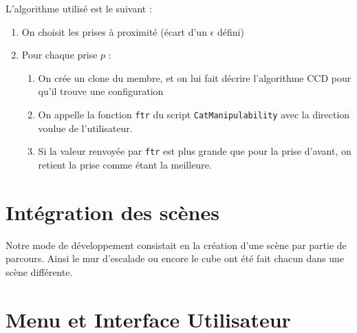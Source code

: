 \documentclass[a4paper,11pt]{article}
\begin{document}
L'algorithme utilisé est le suivant : 
\begin{enumerate}
\item On choisit les prises à proximité (écart d'un $\epsilon$ défini)
\item Pour chaque prise $p$ : 
\begin{enumerate}
\item On crée un clone du membre, et on lui fait décrire l'algorithme CCD pour qu'il trouve une configuration
\item On appelle la fonction \texttt{ftr} du script \texttt{CatManipulability} avec la direction voulue de l'utilisateur. 
\item Si la valeur renvoyée par \texttt{ftr} est plus grande que pour la prise d'avant, on retient la prise comme étant la meilleure.
\end{enumerate}
\end{enumerate}


\section{Intégration des scènes}
Notre mode de développement consistait en la création d’une scène par partie de parcours. Ainsi le mur d’escalade ou encore le cube ont été fait chacun dans une scène différente. 

\section{Menu et Interface Utilisateur}
\end{document}
